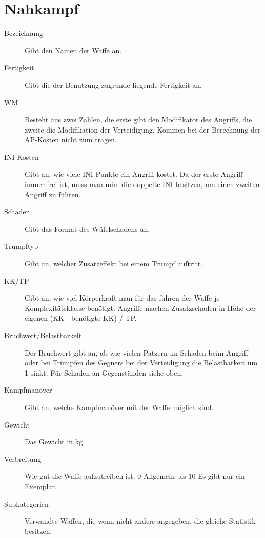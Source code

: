 \documentclass[a4paper,12pt,oneside]{book}
\begin{document}
\section{Nahkampf}
\begin{description}
\item[Bezeichnung]Gibt den Namen der Waffe an.
\item[Fertigkeit]Gibt die der Benutzung zugrunde liegende Fertigkeit an.
\item[WM] Besteht aus zwei Zahlen, die erste gibt den Modifikator des Angriffs, die zweite die Modifikation der Verteidigung. Kommen bei der Berechnung der AP-Kosten nicht zum tragen.
\item[INI-Kosten] Gibt an, wie viele INI-Punkte ein Angriff kostet. Da der erste Angriff immer frei ist, muss man min. die doppelte INI besitzen, um einen zweiten Angriff zu führen.
\item[Schaden] Gibt das Format des Wüfelschadens an.
\item[Trumpftyp] Gibt an, welcher Zusatzeffekt bei einem Trumpf auftritt.
\item[KK/TP] Gibt an, wie viel Körperkraft man für das führen der Waffe je Komplexitätsklasse benötigt. Angriffe machen Zusatzschaden in Höhe der eigenen (KK - benötigte KK) / TP.
\item[Bruchwert/Belastbarkeit] Der Bruchwert gibt an, ab wie vielen Patzern im Schaden beim Angriff oder bei Trümpfen des Gegners bei der Verteidigung die Belastbarkeit um 1 sinkt. Für Schaden an Gegenständen siehe oben.
\item[Kampfmanöver] Gibt an, welche Kampfmanöver mit der Waffe möglich sind.
\item[Gewicht] Das Gewicht in kg.
\item[Verbreitung] Wie gut die Waffe aufzutreiben ist. 0-Allgemein bis 10-Es gibt nur ein Exemplar.
\item[Subkategorien] Verwandte Waffen, die wenn nicht anders angegeben, die gleiche Statistik besitzen.
\end{description}
\end{document}
